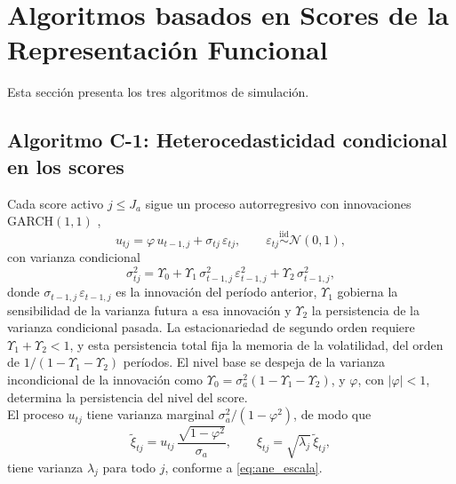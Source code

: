 \section{Algoritmos basados en Scores de la Representación Funcional}
\label{ane_00_02_algoritmos_scores}
Esta sección presenta los tres algoritmos de simulación.

\subsection{Algoritmo C-1: Heterocedasticidad condicional en los scores}
\label{ane_00_02_01_alg_c1}
Cada score activo $j\le J_a$ sigue un proceso autorregresivo con innovaciones GARCH$(1,1)$ \citep{ane_00_01_bollerslev1986generalized},
\begin{equation}\label{eq:ane_algC1_argarch}
    u_{tj} = \varphi\, u_{t-1,j} + \sigma_{tj}\, \varepsilon_{tj},
    \qquad
    \varepsilon_{tj} \overset{\mathrm{iid}}{\sim} \mathcal{N}(0,1),
\end{equation}
con varianza condicional
\begin{equation}\label{eq:ane_algC1_recursion}
    \sigma_{tj}^{2} = \Upsilon_0 + \Upsilon_1\, \sigma_{t-1,j}^{2}\,\varepsilon_{t-1,j}^{2} + \Upsilon_2\, \sigma_{t-1,j}^{2},
\end{equation}
donde $\sigma_{t-1,j}\,\varepsilon_{t-1,j}$ es la innovación del período anterior, $\Upsilon_1$ gobierna la sensibilidad de la varianza futura a esa innovación y $\Upsilon_2$ la persistencia de la varianza condicional pasada. La estacionariedad de segundo orden requiere $\Upsilon_1+\Upsilon_2<1$, y esta persistencia total fija la memoria de la volatilidad, del orden de $1/(1-\Upsilon_1-\Upsilon_2)$ períodos. El nivel base se despeja de la varianza incondicional de la innovación como $\Upsilon_0=\sigma_a^{2}(1-\Upsilon_1-\Upsilon_2)$, y $\varphi$, con $|\varphi|<1$, determina la persistencia del nivel del score.\\

El proceso $u_{tj}$ tiene varianza marginal $\sigma_a^{2}/(1-\varphi^{2})$, de modo que
\begin{equation}
\label{eq:ane_algC1_score}
\tilde{\xi}_{tj}=u_{tj}\,\frac{\sqrt{1-\varphi^{2}}}{\sigma_a},
\qquad
\xi_{tj}=\sqrt{\lambda_j}\,\tilde{\xi}_{tj},
\end{equation}
tiene varianza $\lambda_j$ para todo $j$, conforme a \eqref{eq:ane_escala}.\\

